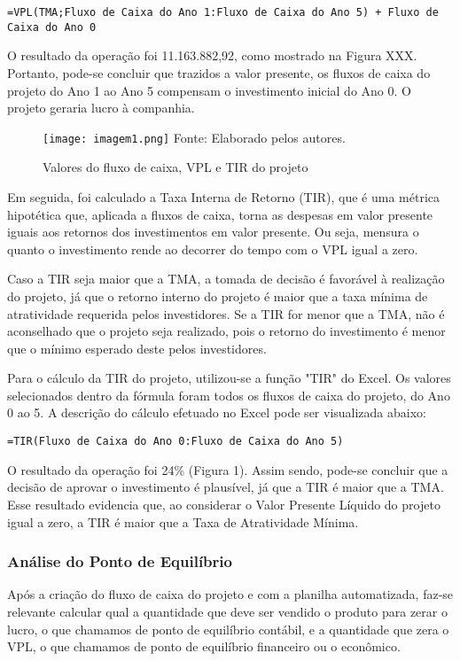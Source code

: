 \documentclass[11pt]{article}
\begin{document}
\begin{verbatim}
=VPL(TMA;Fluxo de Caixa do Ano 1:Fluxo de Caixa do Ano 5) + Fluxo de Caixa do Ano 0
\end{verbatim}

O resultado da operação foi 11.163.882,92, como mostrado na Figura XXX. Portanto, pode-se concluir que trazidos a valor presente, os fluxos de caixa do projeto do Ano 1 ao Ano 5 compensam o investimento inicial do Ano 0. O projeto geraria lucro à companhia.

\begin{figure}[h]
\centering
\caption{Valores do fluxo de caixa, VPL e TIR do projeto}
\texttt{[image: imagem1.png]}
\label{fig:my_label}
\footnotesize{Fonte: Elaborado pelos autores.}
\end{figure}
Em seguida, foi calculado a Taxa Interna de Retorno (TIR), que é uma métrica hipotética que, aplicada a fluxos de caixa, torna as despesas em valor presente iguais aos retornos dos investimentos em valor presente. Ou seja, mensura o quanto o investimento rende ao decorrer do tempo com o VPL igual a zero. 

Caso a TIR seja maior que a TMA, a tomada de decisão é favorável à realização do projeto, já que o retorno interno do projeto é maior que a taxa mínima de atratividade requerida pelos investidores. Se a TIR for menor que a TMA, não é aconselhado que o projeto seja realizado, pois o retorno do investimento é menor que o mínimo esperado deste pelos investidores. 

Para o cálculo da TIR do projeto, utilizou-se a função "TIR" do Excel. Os valores selecionados dentro da fórmula foram todos os fluxos de caixa do projeto, do Ano 0 ao 5. A descrição do cálculo efetuado no Excel pode ser visualizada abaixo:

\begin{verbatim}
=TIR(Fluxo de Caixa do Ano 0:Fluxo de Caixa do Ano 5)
\end{verbatim}

O resultado da operação foi 24\% (Figura 1). Assim sendo, pode-se concluir que a decisão de aprovar o investimento é plausível, já que a TIR é maior que a TMA. Esse resultado evidencia que, ao considerar o Valor Presente Líquido do projeto igual a zero, a TIR é maior que a Taxa de Atratividade Mínima.

\subsubsection{\textbf{Análise do Ponto de Equilíbrio}}
Após a criação do fluxo de caixa do projeto e com a planilha automatizada, faz-se relevante calcular qual a quantidade que deve ser vendido o produto para zerar o lucro, o que chamamos de ponto de equilíbrio contábil, e a quantidade que zera o VPL, o que chamamos de ponto de equilíbrio financeiro ou o econômico.
\end{document}
